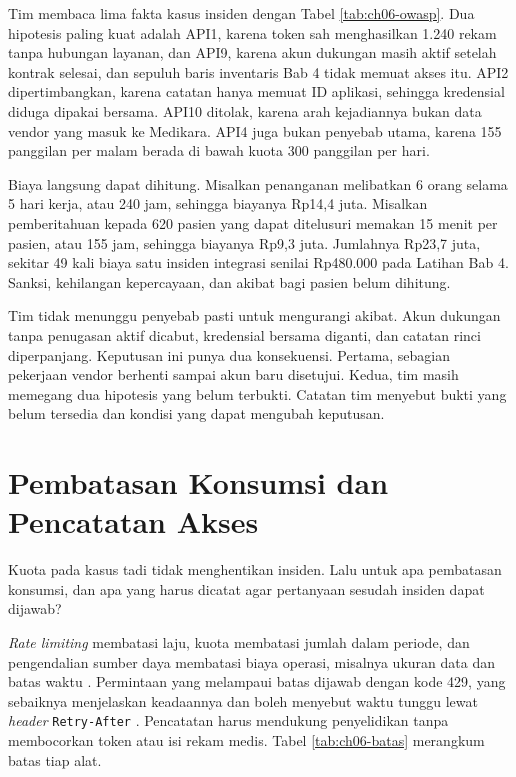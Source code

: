 \begin{kasus}[title={Kasus Medikara Health: Membaca Insiden dengan Daftar OWASP}]
Tim membaca lima fakta kasus insiden dengan Tabel \ref{tab:ch06-owasp}. Dua hipotesis paling kuat adalah API1, karena token
sah menghasilkan 1.240 rekam tanpa hubungan layanan, dan API9, karena akun dukungan masih aktif setelah kontrak selesai, dan
sepuluh baris inventaris Bab 4 tidak memuat akses itu. API2 dipertimbangkan, karena catatan hanya memuat ID aplikasi, sehingga
kredensial diduga dipakai bersama. API10 ditolak, karena arah kejadiannya bukan data vendor yang masuk ke
Medikara. API4 juga bukan penyebab utama, karena 155 panggilan per malam berada di bawah kuota 300 panggilan per hari.

Biaya langsung dapat dihitung. Misalkan penanganan melibatkan 6 orang selama 5 hari kerja, atau 240 jam, sehingga biayanya Rp14,4
juta. Misalkan pemberitahuan kepada 620 pasien yang dapat ditelusuri memakan 15 menit per pasien, atau 155 jam, sehingga biayanya
Rp9,3 juta. Jumlahnya Rp23,7 juta, sekitar 49 kali biaya satu insiden integrasi senilai Rp480.000 pada Latihan Bab 4. Sanksi,
kehilangan kepercayaan, dan akibat bagi pasien belum dihitung.

Tim tidak menunggu penyebab pasti untuk mengurangi akibat. Akun dukungan tanpa penugasan aktif dicabut, kredensial bersama diganti,
dan catatan rinci diperpanjang. Keputusan ini punya dua konsekuensi. Pertama, sebagian pekerjaan vendor berhenti sampai akun baru
disetujui. Kedua, tim masih memegang dua hipotesis yang belum terbukti. Catatan tim menyebut bukti yang belum tersedia dan kondisi
yang dapat mengubah keputusan.
\end{kasus}

\section{Pembatasan Konsumsi dan Pencatatan Akses}

Kuota pada kasus tadi tidak menghentikan insiden. Lalu untuk apa pembatasan konsumsi, dan apa yang harus dicatat agar pertanyaan
sesudah insiden dapat dijawab?

\textit{Rate limiting} membatasi laju, kuota membatasi jumlah dalam periode, dan pengendalian sumber daya membatasi biaya operasi,
misalnya ukuran data dan batas waktu \cite{c06-owasp-api4}. Permintaan yang melampaui batas dijawab dengan kode 429, yang sebaiknya
menjelaskan keadaannya dan boleh menyebut waktu tunggu lewat \textit{header} \texttt{Retry-After} \cite{rfc6585}. Pencatatan harus
mendukung penyelidikan tanpa membocorkan token atau isi rekam medis. Tabel \ref{tab:ch06-batas} merangkum batas tiap alat.

